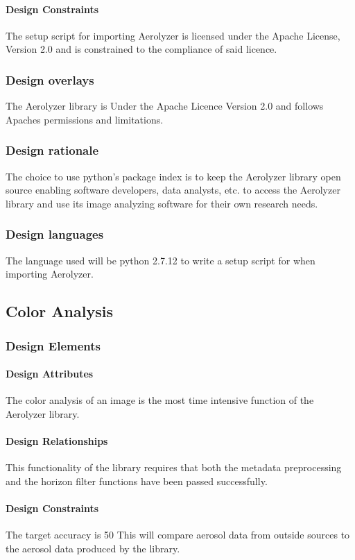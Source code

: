 \documentclass[onecolumn, draftclsnofoot,10pt, compsoc]{IEEEtran}
\begin{document}
\begin{singlespace}
          \paragraph{Design Constraints}
          The setup script for importing Aerolyzer is licensed under the Apache License, Version 2.0 and is constrained to the compliance of said licence. 
      \subsubsection{Design overlays}
      		The Aerolyzer library is Under the Apache Licence Version 2.0 and follows Apaches permissions and limitations.
      \subsubsection{Design rationale}
      		The choice to use python’s package index is to keep the Aerolyzer library open source enabling software developers, data analysts, etc. to access the Aerolyzer library and use its image analyzing software for their own research needs. 
      \subsubsection{Design languages}
      The language used will be python 2.7.12 to write a setup script for when importing Aerolyzer.
	\subsection{Color Analysis}\label{des:coloranalysis}
      \subsubsection{Design Elements}
          \paragraph{Design Attributes}
            The color analysis of an image is the most time intensive function of the Aerolyzer library.
          \paragraph{Design Relationships}
			This functionality of the library requires that both the metadata preprocessing and the horizon filter functions have been passed successfully.
          \paragraph{Design Constraints}
			The target accuracy is 50%
			This will compare aerosol data from outside sources to the aerosol data produced by the library.

\end{singlespace}
\end{document}
